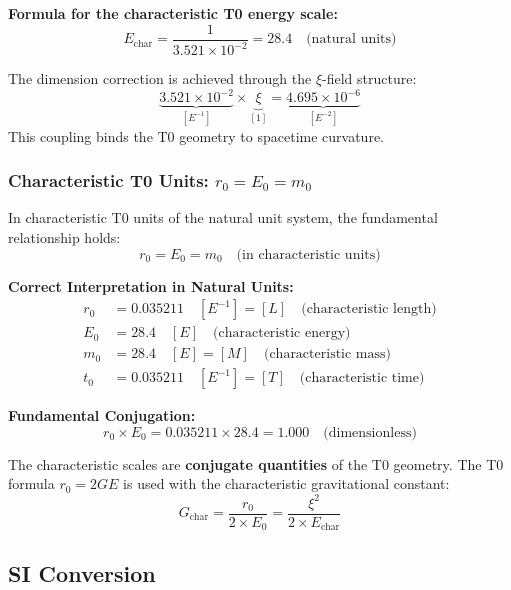 \documentclass[11pt,a4paper]{article}
\begin{document}
	\textbf{Formula for the characteristic T0 energy scale:}
	\begin{equation}
		\boxed{E_{\text{char}} = \frac{1}{3{.}521 \times 10^{-2}} = 28{.}4 \quad \text{(natural units)}}
	\end{equation}
	
	The dimension correction is achieved through the $\xi$-field structure:
	\begin{equation}
		\underbrace{3{.}521 \times 10^{-2}}_{[E^{-1}]} \times \underbrace{\xi}_{[1]} = \underbrace{4{.}695 \times 10^{-6}}_{[E^{-2}]}
	\end{equation}
	This coupling binds the T0 geometry to spacetime curvature.
	
	\subsubsection{Characteristic T0 Units: $r_0 = E_0 = m_0$}
	
	In characteristic T0 units of the natural unit system, the fundamental relationship holds:
	\begin{equation}
		r_0 = E_0 = m_0 \quad \text{(in characteristic units)}
	\end{equation}
	
	\textbf{Correct Interpretation in Natural Units:}
	\begin{align}
		r_0 &= 0{.}035211 \quad [E^{-1}] = [L] \quad \text{(characteristic length)} \\
		E_0 &= 28{.}4 \quad [E] \quad \text{(characteristic energy)} \\
		m_0 &= 28{.}4 \quad [E] = [M] \quad \text{(characteristic mass)} \\
		t_0 &= 0{.}035211 \quad [E^{-1}] = [T] \quad \text{(characteristic time)}
	\end{align}
	
	\textbf{Fundamental Conjugation:}
	\begin{equation}
		r_0 \times E_0 = 0{.}035211 \times 28{.}4 = 1{.}000 \quad \text{(dimensionless)}
	\end{equation}
	
	The characteristic scales are \textbf{conjugate quantities} of the T0 geometry. The T0 formula $r_0 = 2GE$ is used with the characteristic gravitational constant:
	\begin{equation}
		G_{\text{char}} = \frac{r_0}{2 \times E_0} = \frac{\xi^2}{2 \times E_{\text{char}}}
	\end{equation}
	
	
	\subsection{SI Conversion}
	
\end{document}
